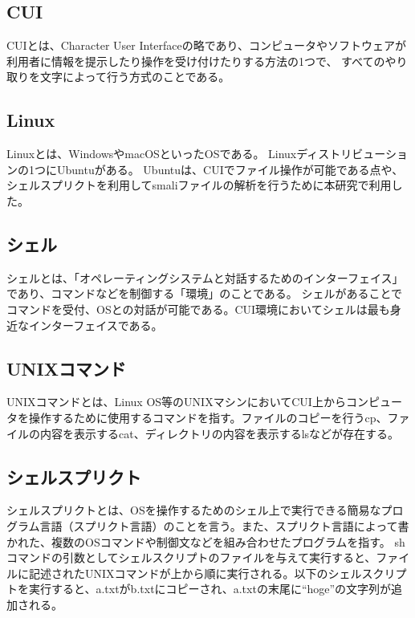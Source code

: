 


\subsection{CUI}
CUIとは、Character User Interfaceの略であり、コンピュータやソフトウェアが利用者に情報を提示したり操作を受け付けたりする方法の1つで、
すべてのやり取りを文字によって行う方式のことである。


\subsection{Linux}
Linuxとは、WindowsやmacOSといったOSである。
Linuxディストリビューションの1つにUbuntuがある。
Ubuntuは、CUIでファイル操作が可能である点や、シェルスプリクトを利用してsmaliファイルの解析を行うために本研究で利用した。


\subsection{シェル}
シェルとは、「オペレーティングシステムと対話するためのインターフェイス」であり、コマンドなどを制御する「環境」のことである。
シェルがあることでコマンドを受付、OSとの対話が可能である。CUI環境においてシェルは最も身近なインターフェイスである。


\subsection{UNIXコマンド}
UNIXコマンドとは、Linux OS等のUNIXマシンにおいてCUI上からコンピュータを操作するために使用するコマンドを指す。ファイルのコピーを行うcp、ファイルの内容を表示するcat、ディレクトリの内容を表示するlsなどが存在する。


\subsection{シェルスプリクト}
シェルスプリクトとは、OSを操作するためのシェル上で実行できる簡易なプログラム言語（スプリクト言語）のことを言う。また、スプリクト言語によって書かれた、複数のOSコマンドや制御文などを組み合わせたプログラムを指す。
shコマンドの引数としてシェルスクリプトのファイルを与えて実行すると、ファイルに記述されたUNIXコマンドが上から順に実行される。以下のシェルスクリプトを実行すると、a.txtがb.txtにコピーされ、a.txtの末尾に“hoge”の文字列が追加される。



